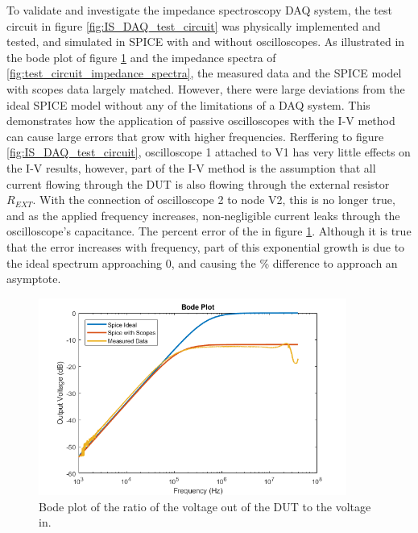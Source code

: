 \par To validate and investigate the impedance spectroscopy DAQ system, the test circuit in figure \ref{fig:IS_DAQ_test_circuit} was physically implemented and tested, and simulated in SPICE with and without oscilloscopes. As illustrated in the bode plot of figure \ref{fig:test_circuit_bode} and the impedance spectra of \ref{fig:test_circuit_impedance_spectra}, the measured data and the SPICE model with scopes data largely matched. However, there were large deviations from the ideal SPICE model without any of the limitations of a DAQ system. This demonstrates how the application of passive oscilloscopes with the I-V method can cause large errors that grow with higher frequencies. Rerffering to figure \ref{fig:IS_DAQ_test_circuit}, oscilloscope 1 attached to V1 has very little effects on the I-V results, however, part of the I-V method is the assumption that all current flowing through the DUT is also flowing through the external resistor $R_{EXT}$. With the connection of oscilloscope 2 to node V2, this is no longer true, and as the applied frequency increases, non-negligible current leaks through the oscilloscope's capacitance. The percent error of the in figure \ref{fig:test_circuit_bode}. Although it is true that the error increases with frequency, part of this exponential growth is due to the ideal spectrum approaching 0, and causing the \% difference to approach an asymptote.  

\begin{figure}[h]
    \centering
    \includegraphics[width=0.9\textwidth]{images/spice-measured-comp.png}
    \caption{Bode plot of the ratio of the voltage out of the DUT to the voltage in.}
    \label{fig:test_circuit_bode}
\end{figure}

